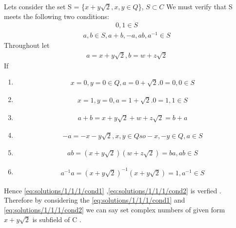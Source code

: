  Lets consider the set S = \{$x + y\sqrt{2},x,y\in Q$\}, $S\subset C $
 We must verify that S meets the following two conditions:
 \begin{align}
     0 , 1 \in S\label{eq:solutions/1/1/1/cond1} 
 \end{align}
 \begin{align}
   a,b \in S , a+b,-a,ab,a^{-1} \in S \label{eq:solutions/1/1/1/cond2}
 \end{align} 
 Throughout let 
 \begin{align}
  a=x+y\sqrt{2}, b=w+z\sqrt{2}
 \end{align}
 If
 \begin{enumerate}
 \item
 \begin{align}
 x=0 , y=0 \in Q , a=0+\sqrt{2}.0 = 0 , 0\in S
 \end{align}
 \item
 \begin{align}
  x=1 , y=0 , a=1+\sqrt{2}.0 =1 , 1 \in S
 \end{align}
 \item
 \begin{align}
 a+b = x+y\sqrt{2}+w+z\sqrt{2} = b+a
 \end{align}
 \item
 \begin{align}
 -a = -x-y\sqrt{2} , x,y\in Q so -x , -y \in Q , a \in S
 \end{align}
 \item
 \begin{align}
 ab=(x+y\sqrt{2})(w+z\sqrt{2})=ba , ab \in S
 \end{align}
 \item
 \begin{align}
 a^{-1} a = (x+y\sqrt{2})^{-1}(x+y\sqrt{2})=1, a^{-1} \in S
\end{align}
\end{enumerate}
Hence \eqref{eq:solutions/1/1/1/cond1} ,\eqref{eq:solutions/1/1/1/cond2} is verfied .
Therefore by considering the \eqref{eq:solutions/1/1/1/cond1} and \eqref{eq:solutions/1/1/1/cond2} we can say set complex numbers of given form $x + y\sqrt{2}$ is subfield of C .
